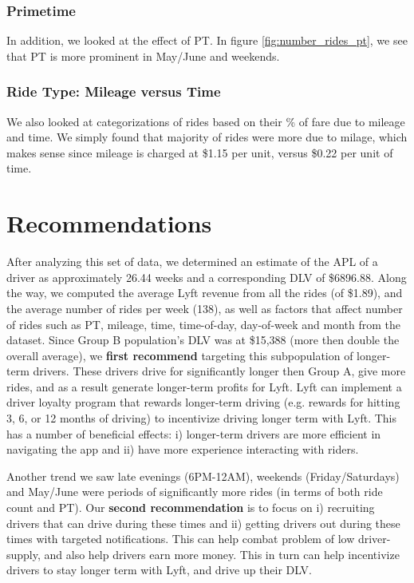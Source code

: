\documentclass{report}
\begin{document}
		\subsubsection{Primetime}
			In addition, we looked at the effect of PT. In figure \ref{fig:number_rides_pt}, we see that PT is more prominent in May/June and weekends.

			\begin{figure}[!htb]

			\end{figure} 

		\subsubsection{Ride Type: Mileage versus Time}
			We also looked at categorizations of rides based on their \% of fare due to mileage and time. We simply found that majority of rides were more due to milage, which makes sense since mileage is charged at \$1.15 per unit, versus \$0.22 per unit of time. 

\section{Recommendations}
	
	After analyzing this set of data, we determined an estimate of the APL of a driver as approximately 26.44 weeks and a corresponding DLV of \$6896.88. Along the way, we computed the average Lyft revenue from all the rides (of \$1.89), and the average number of rides per week (138), as well as factors that affect number of rides such as PT, mileage, time, time-of-day, day-of-week and month from the dataset. Since Group B population's DLV was at \$15,388 (more then double the overall average), we \textbf{first recommend} targeting this subpopulation of longer-term drivers. These drivers drive for significantly longer then Group A, give more rides, and as a result generate longer-term profits for Lyft. Lyft can implement a driver loyalty program that rewards longer-term driving (e.g. rewards for hitting 3, 6, or 12 months of driving) to incentivize driving longer term with Lyft. This has a number of beneficial effects: i) longer-term drivers are more efficient in navigating the app and ii) have more experience interacting with riders. 

	Another trend we saw late evenings (6PM-12AM), weekends (Friday/Saturdays) and May/June were periods of significantly more rides (in terms of both ride count and PT). Our \textbf{second recommendation} is to focus on i) recruiting drivers that can drive during these times and ii) getting drivers out during these times with targeted notifications. This can help combat problem of low driver-supply, and also help drivers earn more money. This in turn can help incentivize drivers to stay longer term with Lyft, and drive up their DLV.
\end{document}
